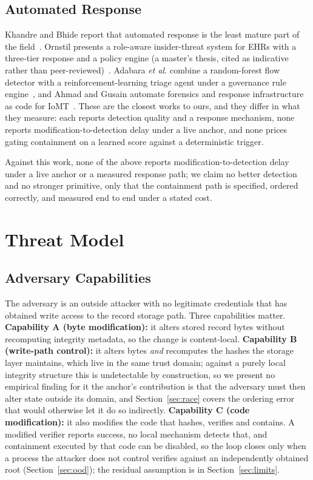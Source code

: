 \documentclass[conference]{IEEEtran}
\begin{document}
\subsection{Automated Response}
Khandre and Bhide report that automated response is the least mature part of the
field~\cite{khandre}. Ornstil presents a role-aware insider-threat system for EHRs with a three-tier
response and a policy engine (a master's thesis, cited as indicative rather than
peer-reviewed)~\cite{ornstil}. Adabara \emph{et al.} combine a random-forest flow detector with a
reinforcement-learning triage agent under a governance rule engine~\cite{adabara}, and Ahmad and Gusain
automate forensics and response infrastructure as code for IoMT~\cite{ahmad}. These are the closest works
to ours, and they differ in what they measure: each reports detection quality and a response mechanism, none
reports modification-to-detection delay under a live anchor, and none prices gating containment on a learned
score against a deterministic trigger.

Against this work, none of the above reports modification-to-detection delay under a live anchor or a measured response path; we claim no better detection and no stronger primitive, only that the containment path is specified, ordered correctly, and measured end to end under a stated cost.

\section{Threat Model}
\label{sec:threat}

\subsection{Adversary Capabilities}
The adversary is an outside attacker with no legitimate credentials that has obtained write access to the
record storage path. Three capabilities matter. \textbf{Capability A (byte modification):} it alters stored
record bytes without recomputing integrity metadata, so the change is content-local. \textbf{Capability B
(write-path control):} it alters bytes \emph{and} recomputes the hashes the storage layer maintains, which
live in the same trust domain; against a purely local integrity structure this is undetectable by
construction, so we present no empirical finding for it the anchor's contribution is that the adversary
must then alter state outside its domain, and Section~\ref{sec:race} covers the ordering error that would
otherwise let it do so indirectly. \textbf{Capability C (code modification):} it also modifies the code that
hashes, verifies and contains. A modified verifier reports success, no local mechanism detects that, and
containment executed by that code can be disabled, so the loop closes only when a process the attacker does
not control verifies against an independently obtained root (Section~\ref{sec:ood}); the residual assumption
is in Section~\ref{sec:limits}.
\end{document}
